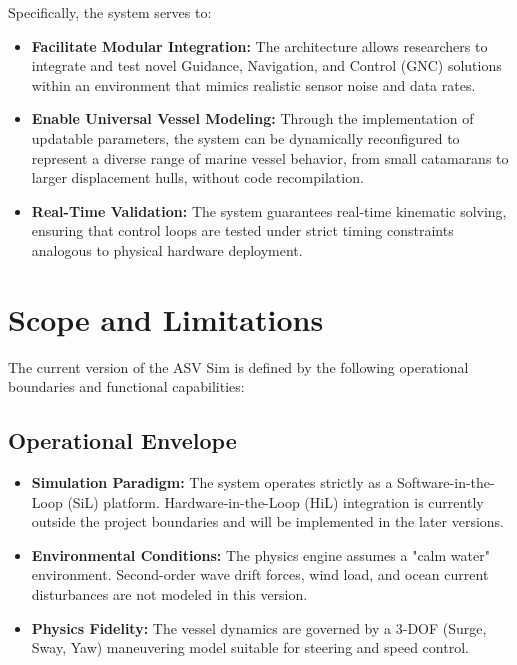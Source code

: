 \documentclass[12pt, a4paper, oneside]{report}
\begin{document}
Specifically, the system serves to:
\begin{itemize}
    
    \item \textbf{Facilitate Modular Integration:} The architecture allows researchers to integrate and test novel Guidance, Navigation, and Control (GNC) solutions within an environment that mimics realistic sensor noise and data rates. 
    
    \item \textbf{Enable Universal Vessel Modeling:} Through the implementation of updatable parameters, the system can be dynamically reconfigured to represent a diverse range of marine vessel behavior, from small catamarans to larger displacement hulls, without code recompilation.
    \item \textbf{Real-Time Validation:} The system guarantees real-time kinematic solving, ensuring that control loops are tested under strict timing constraints analogous to physical hardware deployment.
\end{itemize}

\section{Scope and Limitations}
The current version of the ASV Sim is defined by the following operational boundaries and functional capabilities:

\subsection{Operational Envelope}
\begin{itemize}
    \item \textbf{Simulation Paradigm:} The system operates strictly as a Software-in-the-Loop (SiL) platform. Hardware-in-the-Loop (HiL) integration is currently outside the project boundaries and will be implemented in the later versions.
    \item \textbf{Environmental Conditions:} The physics engine assumes a "calm water" environment. Second-order wave drift forces, wind load, and ocean current disturbances are not modeled in this version.
    \item \textbf{Physics Fidelity:} The vessel dynamics are governed by a 3-DOF (Surge, Sway, Yaw) maneuvering model suitable for steering and speed control. 
    \end{itemize}
\end{document}
